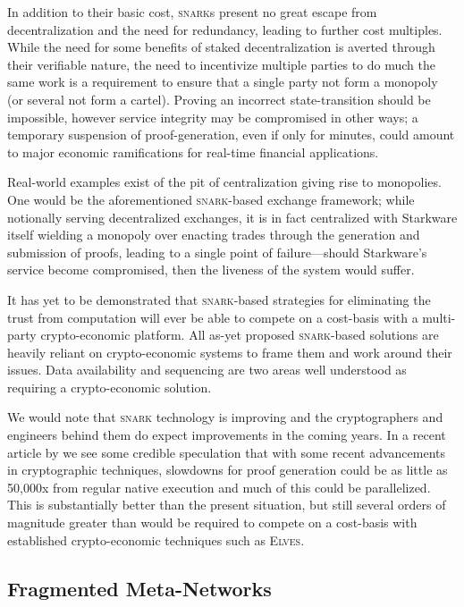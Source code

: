 In addition to their basic cost, \textsc{snark}s present no great escape from decentralization and the need for redundancy, leading to further cost multiples. While the need for some benefits of staked decentralization is averted through their verifiable nature, the need to incentivize multiple parties to do much the same work is a requirement to ensure that a single party not form a monopoly (or several not form a cartel). Proving an incorrect state-transition should be impossible, however service integrity may be compromised in other ways; a temporary suspension of proof-generation, even if only for minutes, could amount to major economic ramifications for real-time financial applications.

Real-world examples exist of the pit of centralization giving rise to monopolies. One would be the aforementioned \textsc{snark}-based exchange framework; while notionally serving decentralized exchanges, it is in fact centralized with Starkware itself wielding a monopoly over enacting trades through the generation and submission of proofs, leading to a single point of failure---should Starkware's service become compromised, then the liveness of the system would suffer.

It has yet to be demonstrated that \textsc{snark}-based strategies for eliminating the trust from computation will ever be able to compete on a cost-basis with a multi-party crypto-economic platform. All as-yet proposed \textsc{snark}-based solutions are heavily reliant on crypto-economic systems to frame them and work around their issues. Data availability and sequencing are two areas well understood as requiring a crypto-economic solution.

We would note that \textsc{snark} technology is improving and the cryptographers and engineers behind them do expect improvements in the coming years. In a recent article by \cite{thaler2023technical} we see some credible speculation that with some recent advancements in cryptographic techniques, slowdowns for proof generation could be as little as 50,000x from regular native execution and much of this could be parallelized. This is substantially better than the present situation, but still several orders of magnitude greater than would be required to compete on a cost-basis with established crypto-economic techniques such as \textsc{Elves}.

\subsection{Fragmented Meta-Networks}

